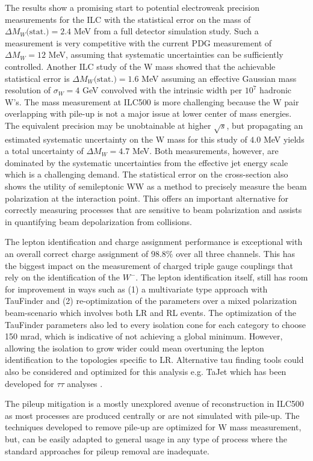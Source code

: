 The results show a promising start to potential electroweak precision measurements for the ILC with the statistical error on the mass of $\Delta M_W\text{(stat.)}= 2.4$ MeV from a full detector simulation study. Such a measurement is very competitive with the current PDG measurement of $\Delta M_W=12$ MeV, assuming that systematic uncertainties can be sufficiently controlled.  Another ILC study of the W mass showed that the achievable statistical error is $\Delta M_W\text{(stat.)} = 1.6$ MeV assuming an effective Gaussian mass resolution of $\sigma_W= 4$ GeV convolved with the intrinsic width per $10^7$ hadronic W's\cite{graham}. The mass measurement at ILC500 is more challenging because the W pair overlapping with pile-up is not a major issue at lower center of mass energies. The equivalent precision may be unobtainable at higher $\sqrt{s}$, but propagating an estimated systematic uncertainty on the W mass for this study of $4.0$ MeV yields a total uncertainty of $\Delta M_W = 4.7$ MeV. Both measurements, however, are dominated by the systematic uncertainties from the effective jet energy scale which is a challenging demand.  The statistical error on the cross-section also shows the utility of semileptonic WW as a method to precisely measure the beam polarization at the interaction point. This offers an important alternative for  correctly measuring processes that are sensitive to beam polarization and assists in quantifying beam depolarization from collisions.

The lepton identification and charge assignment performance is exceptional with an overall correct charge assignment of $98.8\%$ over all three channels. This has the biggest impact on the measurement of charged triple gauge couplings that rely on the identification of the $W^-$. The lepton identification itself, still has room for improvement in ways such as (1) a multivariate type approach with TauFinder and (2) re-optimization of the parameters over a mixed polarization beam-scenario which involves both LR and RL events.  The optimization of the TauFinder parameters also led to every isolation cone for each category to choose 150 mrad, which is indicative of not achieving a global minimum. However, allowing the isolation to grow wider could mean overtuning the lepton identification to the topologies specific to LR. Alternative tau finding tools could also be considered and optimized for this analysis e.g. TaJet which has been developed for $\tau\tau$ analyses \cite{tajet}.

The pileup mitigation is a mostly unexplored avenue of reconstruction in ILC500 as most processes are produced centrally or are not simulated with pile-up. The techniques developed to remove pile-up are optimized for W mass measurement, but, can be easily adapted to general usage in any type of process where the standard approaches for pileup removal are inadequate. 

